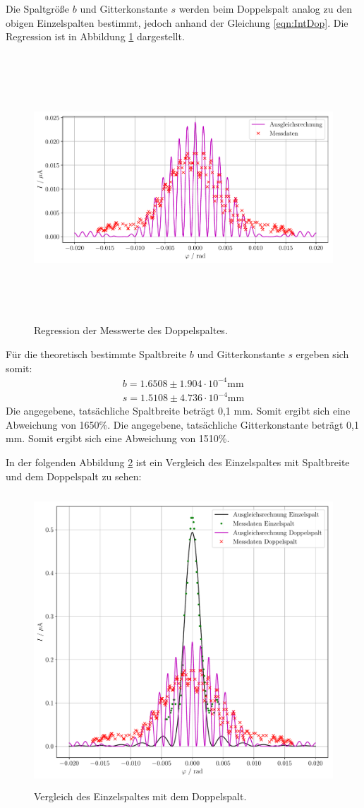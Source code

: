 Die Spaltgröße $b$ und Gitterkonstante $s$ werden beim Doppelspalt analog zu den obigen Einzelspalten bestimmt, jedoch anhand der Gleichung \ref{eqn:IntDop}. Die Regression ist in Abbildung \ref{fig:Doppel} dargestellt.

 \begin{figure}[h]
	\centering
	\includegraphics[height=10cm, width=15cm]{Auswertung/Graph_doppel.pdf}
	\caption{Regression der Messwerte des Doppelspaltes.}
	\label{fig:Doppel}
\end{figure}
 
 Für die theoretisch bestimmte Spaltbreite $b$ und Gitterkonstante $s$ ergeben sich somit:
 \begin{gather*}
 	b =  1.6508 \pm 1.904\cdot10^{-4} \text{mm}\\
	s = 1.5108 \pm 4.736\cdot10^{-4} \text{mm}
\end{gather*}
Die angegebene, tatsächliche Spaltbreite beträgt 0,1 mm. Somit ergibt sich eine Abweichung von 1650\%.
Die angegebene, tatsächliche Gitterkonstante beträgt 0,1 mm. Somit ergibt sich eine Abweichung von 1510\%.

In der folgenden Abbildung \ref{fig:Vergleich} ist ein Vergleich des Einzelspaltes mit Spaltbreite und dem Doppelspalt zu sehen:

 \begin{figure}[h]
	\centering
	\includegraphics[height=11cm, width=15cm]{Auswertung/Vergleich.pdf}
	\caption{Vergleich des Einzelspaltes mit dem Doppelspalt.}
	\label{fig:Vergleich}
\end{figure}
